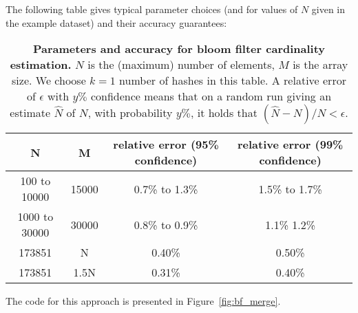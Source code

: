 The following table gives typical parameter choices 
(and for values of $N$ given in the example dataset)
and their accuracy guarantees:


\begin{table}[t]
\begin{center}
\begin{tabular}{cccc}
\toprule
N & M & relative error (95\% confidence) & relative error (99\% confidence)\\
\midrule
 100 to 10000 & 15000 & 0.7\% to 1.3\% & 1.5\% to 1.7\% \\   
1000 to 30000 & 30000 & 0.8\%  to 0.9\% & 1.1\% 1.2\%\\ 
 173851 & N &  0.40\% & 0.50\% \\   
 173851 & 1.5N & 0.31\% & 0.40\% \\   
\bottomrule
\end{tabular}
\end{center}
\caption{{\bf Parameters and accuracy for bloom filter cardinality estimation.}
$N$ is the (maximum) number of elements, $M$ is the array size.
We choose $k=1$ number of hashes in this table.
A relative error of $\epsilon$ 
with $y\%$ confidence means
that on a random run giving an estimate $\hat{N}$ of $N$, 
with probability $y\%$,  
it holds that $(\hat{N}-N)/N < \epsilon$.
}
\end{table}


The code for this approach is presented in Figure~\ref{fig:bf_merge}.

